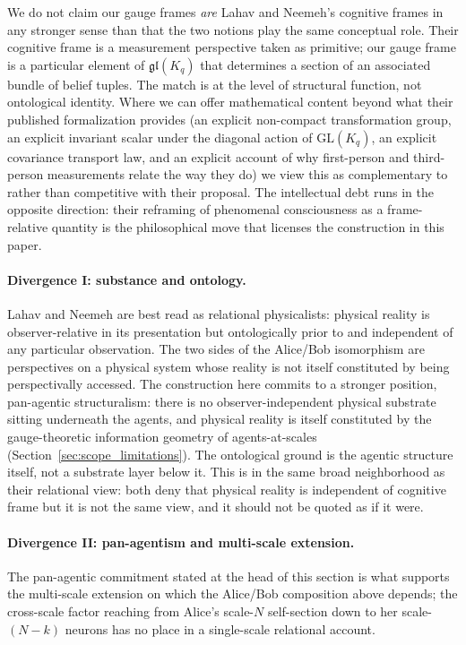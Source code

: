 \documentclass[11pt]{article}
\begin{document}
We do not claim our gauge frames \emph{are} Lahav and Neemeh's cognitive frames in any stronger sense than that the two notions play the same conceptual role. Their cognitive frame is a measurement perspective taken as primitive; our gauge frame is a particular element of $\mathfrak{gl}(K_q)$ that determines a section of an associated bundle of belief tuples. The match is at the level of structural function, not ontological identity. Where we can offer mathematical content beyond what their published formalization provides  (an explicit non-compact transformation group, an explicit invariant scalar under the diagonal action of $\mathrm{GL}(K_q)$, an explicit covariance transport law, and an explicit account of why first-person and third-person measurements relate the way they do) we view this as complementary to rather than competitive with their proposal. The intellectual debt runs in the opposite direction: their reframing of phenomenal consciousness as a frame-relative quantity is the philosophical move that licenses the construction in this paper.

\paragraph{Divergence I: substance and ontology.}
Lahav and Neemeh are best read as relational physicalists: physical reality is observer-relative in its presentation but ontologically prior to and independent of any particular observation. The two sides of the Alice/Bob isomorphism are perspectives on a physical system whose reality is not itself constituted by being perspectivally accessed. The construction here commits to a stronger position, pan-agentic structuralism: there is no observer-independent physical substrate sitting underneath the agents, and physical reality is itself constituted by the gauge-theoretic information geometry of agents-at-scales (Section~\ref{sec:scope_limitations}). The ontological ground is the agentic structure itself, not a substrate layer below it. This is in the same broad neighborhood as their relational view: both deny that physical reality is independent of cognitive frame but it is not the same view, and it should not be quoted as if it were.

\paragraph{Divergence II: pan-agentism and multi-scale extension.}
The pan-agentic commitment stated at the head of this section is what supports the multi-scale extension on which the Alice/Bob composition above depends; the cross-scale factor reaching from Alice's scale-$N$ self-section down to her scale-$(N-k)$ neurons has no place in a single-scale relational account.
\end{document}
